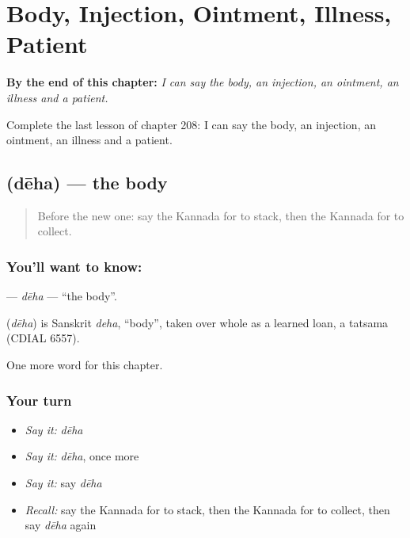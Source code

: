 
\chapter{Body, Injection, Ointment, Illness, Patient}
\label{ch:ka-body-injection-ointment-illness-patient}

\begin{chapteropening}
\textbf{By the end of this chapter:} \emph{I can say the body, an injection, an ointment, an illness and a patient.}

Complete the last lesson of chapter 208: I can say the body, an injection, an ointment, an illness and a patient.
\end{chapteropening}

\section[\texorpdfstring{\kn{ದೇಹ} (dēha)}{ದೇಹ (dēha)}]{ (dēha) — the body}

\label{lesson:KA-C208-deha}



\begin{quote}
Before the new one: say the Kannada for to stack, then the Kannada for to collect.
\end{quote}

\subsection*{You'll want to know: }
\textbf{} — \emph{dēha} — \textquotedblleft{}the body\textquotedblright{}.

\begin{cousinweb}
\textbf{} (\emph{dēha}) is Sanskrit \emph{deha}, \textquotedblleft{}body\textquotedblright{}, taken over whole as a learned loan, a tatsama (CDIAL 6557).
\end{cousinweb}

\begin{grammarlens}[title={What you've built}]
One more word for this chapter.
\end{grammarlens}

\subsection*{Your turn}
\begin{itemize}
\raggedright
  \item \emph{Say it:} \emph{dēha}
  \item \emph{Say it:} \emph{dēha}, once more
  \item \emph{Say it:} say \emph{dēha}
  \item \emph{Recall:} say the Kannada for to stack, then the Kannada for to collect, then say \emph{dēha} again
\end{itemize}

